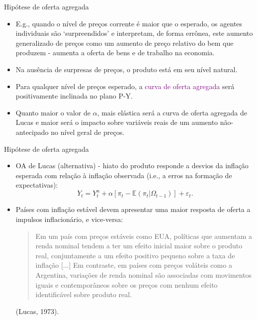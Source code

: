 \documentclass[10pt]{beamer}
\begin{document}
\begin{frame}{Hipótese de oferta agregada}
    \begin{itemize}
        \item E.g., quando o nível de preços corrente é maior que o esperado, os agentes individuais são `surpreendidos' e interpretam, de forma errônea, este aumento generalizado de preços como um aumento de preço relativo do bem que produzem - aumenta a oferta de bens e de trabalho na economia.
        \bigskip
        \item Na ausência de surpresas de preços, o produto está em seu nível natural.
        \bigskip
        \item Para qualquer nível de preços esperado, a \textcolor{purple}{curva de oferta agregada} será positivamente inclinada no plano P-Y.
        \bigskip
        \item Quanto maior o valor de $\alpha$, mais elástica será a curva de oferta agregada de Lucas e maior será o impacto sobre variáveis reais de um aumento não-antecipado no nível geral de preços.
    \end{itemize}
\end{frame}

\begin{frame}{Hipótese de oferta agregada}
    \begin{itemize}
        \item OA de Lucas (alternativa) - hiato do produto responde a desvios da inflação esperada com relação à inflação observada (i.e., a erros na formação de expectativas):
        \begin{equation}
            Y_t = Y_t^n + \alpha[\pi_t - \mathbb{E}(\pi_t|\Omega_{t-1})] + \varepsilon_t.
            \label{eq5}
        \end{equation}
        \bigskip
        \item Países com inflação estável  devem apresentar uma maior resposta de oferta a impulsos inflacionário, e vice-versa:
        \begin{quote}
            Em um país com preços estáveis como EUA, políticas que aumentam a renda nominal tendem a ter um efeito inicial maior sobre o produto real, conjuntamente a um efeito positivo pequeno sobre a taxa de inflação [...] Em contraste, em países com preços voláteis como a Argentina, variações de renda nominal são associadas com movimentos iguais e contemporâneos sobre os preços com nenhum efeito identificável sobre produto real.
        \end{quote}
        \begin{flushright}
            (Lucas, 1973).
        \end{flushright}
    \end{itemize}
\end{frame}
\end{document}
